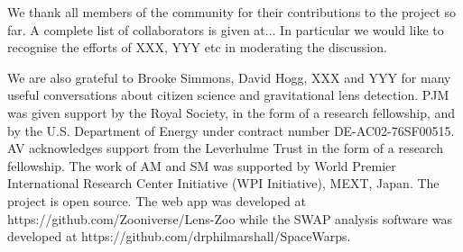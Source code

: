 We thank all \Ncollaboration members of the \sw community for their
contributions to the project so far. A complete list of collaborators is
given at... In particular we would like to recognise the efforts of XXX,
YYY etc in moderating the discussion.

We are also grateful to Brooke Simmons, David Hogg, XXX and YYY for many useful
conversations about citizen science and gravitational lens detection. 
%
PJM was given support by the Royal Society, in the form of a research
fellowship, and by the U.S. Department of Energy under contract number DE-AC02-76SF00515.
%
AV acknowledges support from the Leverhulme Trust in the form of a research
fellowship.
%
The work of AM and SM was supported by World Premier International Research
Center Initiative (WPI Initiative), MEXT, Japan.
%
% 
%
The \sw project is open source. 
The web app was developed at https://github.com/Zooniverse/Lens-Zoo
while the SWAP analysis software was developed at
https://github.com/drphilmarshall/SpaceWarps.
